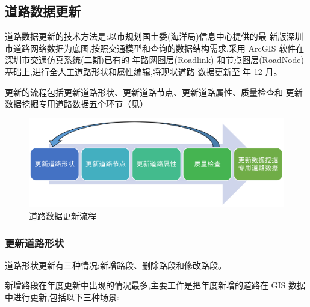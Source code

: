 \subsection{道路数据更新}
道路数据更新的技术方法是:以市规划国土委(海洋局)信息中心提供的最
新版深圳市道路网络数据为底图,按照交通模型和查询的数据结构需求,采用
ArcGIS 软件在深圳市交通仿真系统(二期)已有的 \ppyear 年路网图层(Roadlink)
和节点图层(RoadNode)基础上,进行全人工道路形状和属性编辑,将现状道路
数据更新至 \pyear 年 12 月。

更新的流程包括更新道路形状、更新道路节点、更新道路属性、质量检查和
更新数据挖掘专用道路数据五个环节（见）

\begin{figure}[ht]
  \centering
  \includegraphics[width=\textwidth]{figures/chp02_道路数据更新流程.png}
  \caption{道路数据更新流程\label{fig:道路数据更新流程} }
\end{figure}

\subsubsection{更新道路形状}
道路形状更新有三种情况:新增路段、删除路段和修改路段。

新增路段在年度更新中出现的情况最多,主要工作是把年度新增的道路在
GIS 数据中进行更新,包括以下三种场景:

